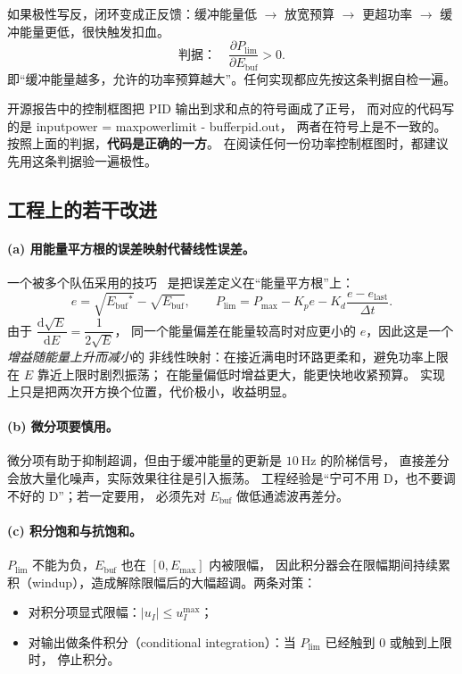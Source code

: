 \documentclass[cn,blue,11pt,device=normal]{elegantnote}
\newcommand{\code}[1]{{\ttfamily\small\def\_{\textunderscore\allowbreak}#1}}
\newcommand{\Ebuf}{E_{\mathrm{buf}}{}}
\newcommand{\Plim}{P_{\mathrm{lim}}{}}
\newcommand{\Pmax}{P_{\max}{}}
\newcommand{\dd}{\mathrm{d}}
\begin{document}
如果极性写反，闭环变成正反馈：缓冲能量低 $\to$ 放宽预算 $\to$ 更超功率 $\to$
缓冲能量更低，很快触发扣血。
\begin{equation}
  \text{判据：}\quad
  \frac{\partial \Plim}{\partial \Ebuf} > 0 .
\end{equation}
即“缓冲能量越多，允许的功率预算越大”。任何实现都应先按这条判据自检一遍。

\begin{remark}
开源报告中的控制框图把 PID 输出到求和点的符号画成了正号，
而对应的代码写的是 \code{input\_power = max\_power\_limit - buffer\_pid.out}，
两者在符号上是不一致的。按照上面的判据，\textbf{代码是正确的一方}。
在阅读任何一份功率控制框图时，都建议先用这条判据验一遍极性。
\end{remark}

\subsection{工程上的若干改进}

\paragraph{(a) 用能量平方根的误差映射代替线性误差。}
一个被多个队伍采用的技巧~\cite{hkustpowermodule} 是把误差定义在“能量平方根”上：
\begin{equation}\label{eq:sqrterror}
  e = \sqrt{\Ebuf^{\ast}} - \sqrt{\Ebuf},
  \qquad
  \Plim = \Pmax - K_p e - K_d\frac{e - e_{\mathrm{last}}}{\Delta t}.
\end{equation}
由于 $\dfrac{\dd\sqrt{E}}{\dd E} = \dfrac{1}{2\sqrt{E}}$，
同一个能量偏差在能量较高时对应更小的 $e$，因此这是一个\emph{增益随能量上升而减小}的
非线性映射：在接近满电时环路更柔和，避免功率上限在 $E$ 靠近上限时剧烈振荡；
在能量偏低时增益更大，能更快地收紧预算。
实现上只是把两次开方换个位置，代价极小，收益明显。

\paragraph{(b) 微分项要慎用。}
微分项有助于抑制超调，但由于缓冲能量的更新是 $10\ \mathrm{Hz}$ 的阶梯信号，
直接差分会放大量化噪声，实际效果往往是引入振荡。
工程经验是“宁可不用 D，也不要调不好的 D”；若一定要用，
必须先对 $\Ebuf$ 做低通滤波再差分。

\paragraph{(c) 积分饱和与抗饱和。}
$\Plim$ 不能为负，$\Ebuf$ 也在 $[0,E_{\max}]$ 内被限幅，
因此积分器会在限幅期间持续累积（windup），造成解除限幅后的大幅超调。两条对策：
\begin{itemize}
  \item 对积分项显式限幅：$|u_I| \le u_I^{\max}$；
  \item 对输出做条件积分（conditional integration）：当 $\Plim$ 已经触到 $0$ 或触到上限时，
  停止积分。
\end{itemize}
\end{document}
